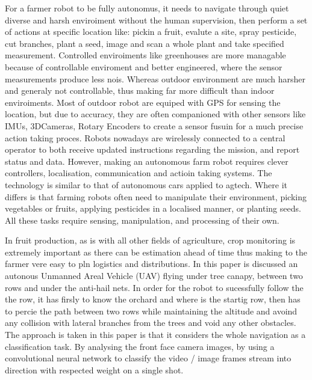 \documentclass[10pt,jaurnal,compsoc]{IEEEtran}
\begin{document}
For a farmer robot to be fully autonomus, it needs to navigate through quiet diverse and harsh enviroiment without the human supervision, then perform a set of actions at specific location like: pickin a fruit, evalute a site, spray pesticide, cut branches, plant a seed, image and scan a whole plant and take specified measurement. Controlled enviroiments like greenhouses are more managable because of controllable enviroment and better engineered, where the sensor measurements produce less nois. Whereas outdoor environment are much harsher and generaly not controllable, thus making far more difficult than indoor enviroiments. Most of outdoor robot are equiped with GPS for sensing the location, but due to accuracy, they are often companioned with other sensors like IMUs, 3DCameras, Rotary Encoders to create a sensor fusuin for a much precise action taking proces. Robots nowadays are wirelessly connected to a central operator to both receive updated instructions regarding the mission, and report status and data. However, making an autonomous farm robot requires clever controllers, localisation, communication and actioin taking systems. The technology is similar to that of autonomous cars applied to agtech. Where it differs is that farming robots often need to manipulate their environment, picking vegetables or fruits, applying pesticides in a localised manner, or planting seeds. All these tasks require sensing, manipulation, and processing of their own.

In fruit production, as is with all other fields of agriculture, crop monitoring is extremely important as there can be estimation ahead of time thus making to the farmer vere easy to pln logistics and distributions. In this paper is discussed an autonous Unmanned Areal Vehicle (UAV) flying under tree canapy, between two rows and under the anti-hail nets. In order for the robot to sucessfully follow the the row, it has firsly to know the orchard and where is the startig row, then has to percie the path between two rows while maintaining the altitude and avoind any collision with lateral branches from the trees and void any other obstacles. The approach is taken in this paper is that it considers the whole navigation as a classification task. By analysing the front face camera images, by using a convolutional neural network to classify the video / image frames stream into direction with respected weight on a single shot.
\end{document}
